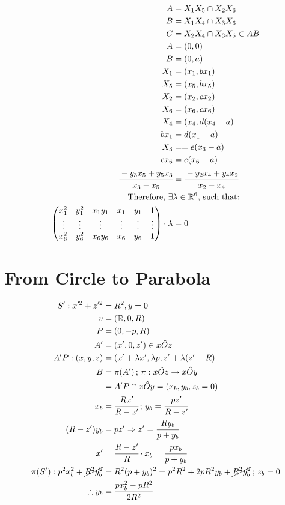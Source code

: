 \documentclass[12pt]{article}
\numberwithin{table}{section}
\begin{document}
\begin{align}
    A &= X_1 X_5 \cap X_2 X_6 \\
    B &= X_1 X_4 \cap X_3 X_6 \\
    C &= X_2 X_4 \cap X_3 X_5 \in AB \\
    A &= (0,0) \\
    B &= (0,a) \\
    X_1 &= (x_1, bx_1) \\
    X_5 &= (x_5, bx_5) \\
    X_2 &= (x_2, cx_2) \\
    X_6 &= (x_6, cx_6) \\
    X_4 &= (x_4, d(x_4 - a) \\
    bx_1 &= d(x_1 - a) \\
    X_3 &== e(x_3 - a) \\
    cx_6 &= e(x_6 - a) \\
    \cfrac{-y_3 x_5 + y_5 x_3}{x_3 - x_5} &= \cfrac{-y_2 x_4 + y_4 x_2}{x_2 - x_4} \\
    \text{Therefore, } \exists &\lambda\in\mathbb{R}^6\text{, such that:} \nonumber \\
    \begin{pmatrix}
        x_1^2 & y_1^2 & x_1 y_1 & x_1 & y_1 & 1 \\
        \vdots & \vdots & \vdots & \vdots & \vdots & \vdots \\
        x_6^2 & y_6^2 & x_6 y_6 & x_6 & y_6 & 1 
    \end{pmatrix}\cdot \lambda &= 0
\end{align}

\section{From Circle to Parabola}

\begin{align}
S': x'^2 + z'^2 &= R^2, y = 0 \\
v &= (\mathbb{R}, 0, R) \\
P &= (0, -p, R) \\
A' &= (x', 0, z') \in x\hat Oz \\
A'P: (x,y,z) &= (x' + \lambda x', \lambda p, z' + \lambda (z' - R) \\
B &= \pi(A')\,;\,\pi: x\hat Oz \to x\hat Oy \\
&= A'P \cap x\hat O y = (x_b, y_b, z_b = 0) \\
x_b &= \cfrac{Rx'}{R-z'}\,;\,y_b = \cfrac{pz'}{R-z'} \\
(R - z') y_b &= pz' \Rightarrow z' = \cfrac{Ry_b}{p+y_b} \\
x' &= \cfrac{R-z'}{R}\cdot x_b = \cfrac{px_b}{p+y_b} \\
\pi(S'): p^2 x_b^2 + \cancel{R^2 y_b^2} &= R^2 (p+y_b)^2 = p^2 R^2 + 2pR^2y_b + \cancel{R^2 y_b^2}\,;\,z_b=0 \\
\therefore y_b &= \cfrac{px_b^2 - p R^2}{2R^2}
\end{align}
\end{document}
